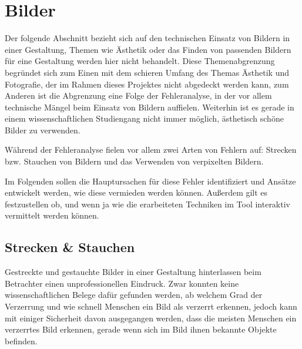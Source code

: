 
\chapter{Bilder} %

\label{Bilder} %



Der folgende Abschnitt bezieht sich auf den technischen Einsatz von Bildern in einer Gestaltung, Themen wie Ästhetik oder das Finden von passenden Bildern für eine Gestaltung werden hier nicht behandelt.
Diese Themenabgrenzung begründet sich zum Einen mit dem schieren Umfang des Themas Ästhetik und Fotografie, der im Rahmen dieses Projektes nicht abgedeckt werden kann, zum Anderen ist die Abgrenzung eine Folge der Fehleranalyse, in der vor allem technische Mängel beim Einsatz von Bildern auffielen. Weiterhin ist es gerade in einem wissenschaftlichen Studiengang nicht immer möglich, ästhetisch schöne Bilder zu verwenden.

Während der Fehleranalyse fielen vor allem zwei Arten von Fehlern auf: Strecken bzw. Stauchen von Bildern und das Verwenden von verpixelten Bildern.

Im Folgenden sollen die Hauptursachen für diese Fehler identifiziert und Ansätze entwickelt werden, wie diese vermieden werden können. Außerdem gilt es festzustellen ob, und wenn ja wie die erarbeiteten Techniken im Tool interaktiv vermittelt werden können.

\section{Strecken \& Stauchen}
Gestreckte und gestauchte Bilder in einer Gestaltung hinterlassen beim Betrachter einen unprofessionellen Eindruck.
Zwar konnten keine wissenschaftlichen Belege dafür gefunden werden, ab welchem Grad der Verzerrung und wie schnell Menschen ein Bild als verzerrt erkennen, jedoch kann mit einiger Sicherheit davon ausgegangen werden, dass die meisten Menschen ein verzerrtes Bild erkennen, gerade wenn sich im Bild ihnen bekannte Objekte befinden.

